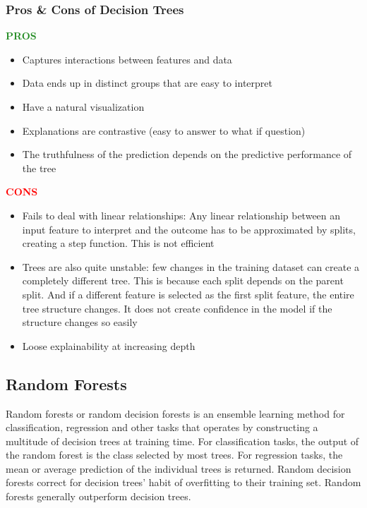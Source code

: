 \subsubsection{Pros \& Cons of Decision Trees}
\begin{minipage}[t]{0.45\textwidth}
    \textcolor{ForestGreen}{\textbf{PROS}}
    \begin{itemize}
        \item Captures interactions between features and data
        \item Data ends up in distinct groups that are easy to interpret
        \item Have a natural visualization
        \item Explanations are contrastive (easy to answer to what if question)
        \item The truthfulness of the prediction depends on the predictive performance of the tree
    \end{itemize}
\end{minipage}
\hspace*{0.05\textwidth}
\begin{minipage}[t]{0.45\textwidth}
    \textcolor{Red}{\textbf{CONS}}
    \begin{itemize}
        \item Fails to deal with linear relationships: Any linear relationship between an input feature to interpret and the outcome has to be approximated by splits, creating a step function. This is not efficient
        \item Trees are also quite unstable: few changes in the training dataset can create a completely different tree. This is because each split depends on the parent split. And if a different feature is selected as the first split feature, the entire tree structure changes. It does not create confidence in the model if the structure changes so easily
        \item Loose explainability at increasing depth
    \end{itemize}
\end{minipage}

\subsection{Random Forests}
Random forests or random decision forests is an ensemble learning method for classification, regression and other tasks that operates by constructing a multitude of decision trees at training time.
For classification tasks, the output of the random forest is the class selected by most trees. For regression tasks, the mean or average prediction of the individual trees is returned.
Random decision forests correct for decision trees' habit of overfitting to their training set. Random forests generally outperform decision trees.\\

